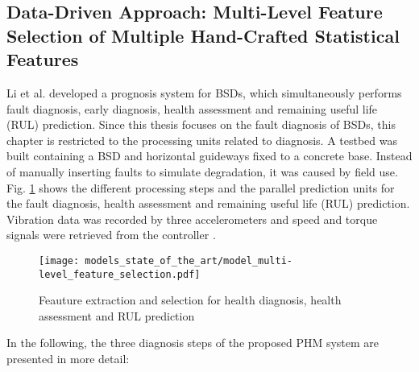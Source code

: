 \subsection{Data-Driven Approach: Multi-Level Feature Selection of Multiple Hand-Crafted Statistical Features}
Li et al. \cite{LiPin2018} developed a prognosis system for BSDs, which simultaneously performs fault diagnosis, early diagnosis, health assessment and remaining useful life (RUL) prediction. Since this thesis focuses on the fault diagnosis of BSDs, this chapter is restricted to the processing units related to diagnosis. A testbed was built containing a BSD and horizontal guideways fixed to a concrete base. Instead of manually inserting faults to simulate degradation, it was caused by field use. Fig.  \ref{fig:level_feature_selection_model} shows the different processing steps and the parallel prediction units for the fault diagnosis, health assessment and remaining useful life (RUL) prediction. Vibration data was recorded by three accelerometers and speed and torque signals were retrieved from the controller \cite{LiPin2018}. 

\begin{figure}[H]
  \centering
  \texttt{[image: models\_state\_of\_the\_art/model\_multi-level\_feature\_selection.pdf]}
  \caption{Feauture extraction and selection for health diagnosis, health assessment and RUL prediction \cite{LiPin2018}}
  \label{fig:level_feature_selection_model}
\end{figure}

In the following, the three diagnosis steps of the proposed PHM system are presented in more detail:

